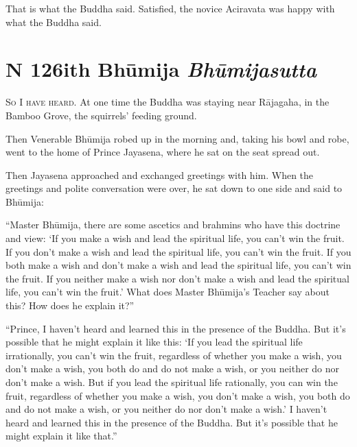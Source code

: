 \documentclass[12pt,openany]{book}%
\newcommand*{\suttatitleacronym}[1]{\smaller[2]{#1}\vspace*{.3em}}
\newcommand*{\suttatitletranslation}[1]{\linebreak{#1}}
\newcommand*{\suttatitleroot}[1]{\linebreak\smaller[2]\itshape{#1}}
\newcommand*{\tocacronym}[1]{\hspace*{-3.3em}{#1}\quad}
\newcommand*{\toctranslation}[1]{#1}
\newcommand*{\tocroot}[1]{(\textit{#1})}
\newcommand*{\scevam}[1]{\textsc{#1}}
\begin{document}
That is what the Buddha said. Satisfied, the novice Aciravata was happy with what the Buddha said. 

%
\section*{{\suttatitleacronym MN 126}{\suttatitletranslation With Bhūmija }{\suttatitleroot Bhūmijasutta}}
\addcontentsline{toc}{section}{\tocacronym{MN 126} \toctranslation{With Bhūmija } \tocroot{Bhūmijasutta}}

\scevam{So I have heard. }At one time the Buddha was staying near \textsanskrit{Rājagaha}, in the Bamboo Grove, the squirrels’ feeding ground. 

Then Venerable \textsanskrit{Bhūmija} robed up in the morning and, taking his bowl and robe, went to the home of Prince Jayasena, where he sat on the seat spread out. 

Then Jayasena approached and exchanged greetings with him. When the greetings and polite conversation were over, he sat down to one side and said to \textsanskrit{Bhūmija}: 

“Master \textsanskrit{Bhūmija}, there are some ascetics and brahmins who have this doctrine and view: ‘If you make a wish and lead the spiritual life, you can’t win the fruit. If you don’t make a wish and lead the spiritual life, you can’t win the fruit. If you both make a wish and don’t make a wish and lead the spiritual life, you can’t win the fruit. If you neither make a wish nor don’t make a wish and lead the spiritual life, you can’t win the fruit.’ What does Master \textsanskrit{Bhūmija}’s Teacher say about this? How does he explain it?” 

“Prince, I haven’t heard and learned this in the presence of the Buddha. But it’s possible that he might explain it like this: ‘If you lead the spiritual life irrationally, you can’t win the fruit, regardless of whether you make a wish, you don’t make a wish, you both do and do not make a wish, or you neither do nor don’t make a wish. But if you lead the spiritual life rationally, you can win the fruit, regardless of whether you make a wish, you don’t make a wish, you both do and do not make a wish, or you neither do nor don’t make a wish.’ I haven’t heard and learned this in the presence of the Buddha. But it’s possible that he might explain it like that.” 
\end{document}
